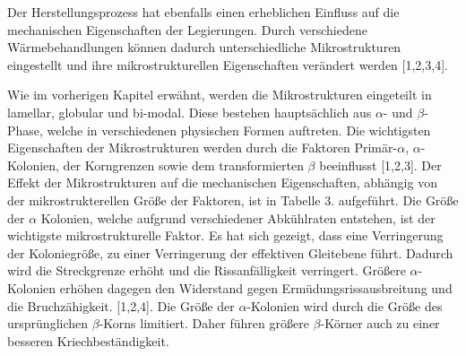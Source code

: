 Der Herstellungsprozess hat ebenfalls einen erheblichen Einfluss auf die mechanischen Eigenschaften der Legierungen. Durch verschiedene Wärmebehandlungen können dadurch unterschiedliche Mikrostrukturen eingestellt und ihre mikrostrukturellen Eigenschaften verändert werden [1,2,3,4].

Wie im vorherigen Kapitel erwähnt, werden die Mikrostrukturen eingeteilt in lamellar, globular und bi-modal. Diese bestehen hauptsächlich aus $\alpha$- und $\beta$-Phase, welche in verschiedenen physischen Formen auftreten. Die wichtigsten Eigenschaften der Mikrostrukturen werden durch die Faktoren Primär-$\alpha$, $\alpha$-Kolonien, der Korngrenzen sowie dem transformierten $\beta$ beeinflusst [1,2,3]. Der Effekt der Mikrostrukturen auf die mechanischen Eigenschaften, abhängig von der mikrostrukterellen Größe der Faktoren, ist in Tabelle 3. aufgeführt. Die Größe der $\alpha$ Kolonien, welche aufgrund verschiedener Abkühlraten entstehen, ist der wichtigste mikrostrukturelle Faktor. Es hat sich gezeigt, dass eine Verringerung der Koloniegröße, zu einer Verringerung der effektiven Gleitebene führt. Dadurch wird die Streckgrenze erhöht und die Rissanfälligkeit verringert. Größere $\alpha$-Kolonien erhöhen dagegen den Widerstand gegen Ermüdungsrissausbreitung und die Bruchzähigkeit. [1,2,4]. Die Größe der $\alpha$-Kolonien wird durch die Größe des ursprünglichen $\beta$-Korns limitiert. Daher führen größere $\beta$-Körner auch zu einer besseren Kriechbeständigkeit.


